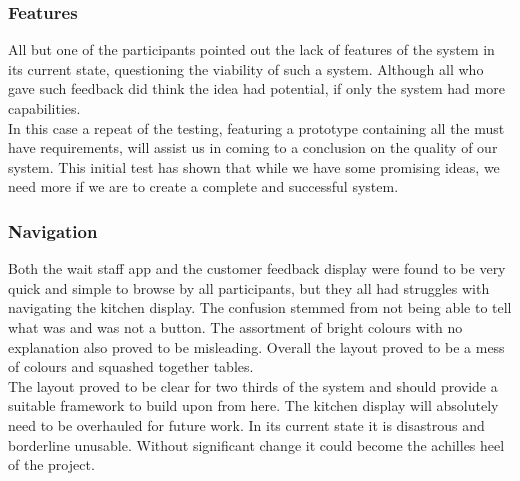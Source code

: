 \documentclass[11pt, a4paper]{report}
\begin{document}
\subsubsection{Features} 
All   but   one   of   the   participants   pointed   out   the   lack   of   features   of   the   system   in   its current   state,   questioning   the   viability   of   such   a   system.   Although   all   who   gave   such feedback   did   think   the   idea   had   potential,   if   only   the   system   had   more   capabilities.\\
In   this   case   a   repeat   of   the   testing,   featuring   a   prototype   containing   all   the   must have   requirements,   will   assist   us   in   coming   to   a   conclusion   on   the   quality   of   our system.   This   initial   test   has   shown   that   while   we   have   some   promising   ideas,   we need   more   if   we   are   to   create   a   complete   and   successful   system.\\
\subsubsection{Navigation}

Both   the   wait   staff   app   and   the   customer   feedback   display   were   found   to   be   very quick   and   simple   to   browse   by   all   participants,   but   they   all   had   struggles   with navigating   the   kitchen   display.   The   confusion   stemmed   from   not   being   able   to   tell what   was   and   was   not   a   button.   The   assortment   of   bright   colours   with   no explanation   also   proved   to   be   misleading.   Overall   the   layout   proved   to   be   a   mess   of colours   and   squashed   together   tables.\\
The   layout   proved   to   be   clear   for   two   thirds   of   the   system   and   should   provide   a suitable   framework   to   build   upon   from   here.   The   kitchen   display   will   absolutely need   to   be   overhauled   for   future   work.   In   its   current   state   it   is   disastrous   and borderline   unusable.   Without   significant   change   it   could   become   the   achilles   heel   of the   project.\\
\end{document}
